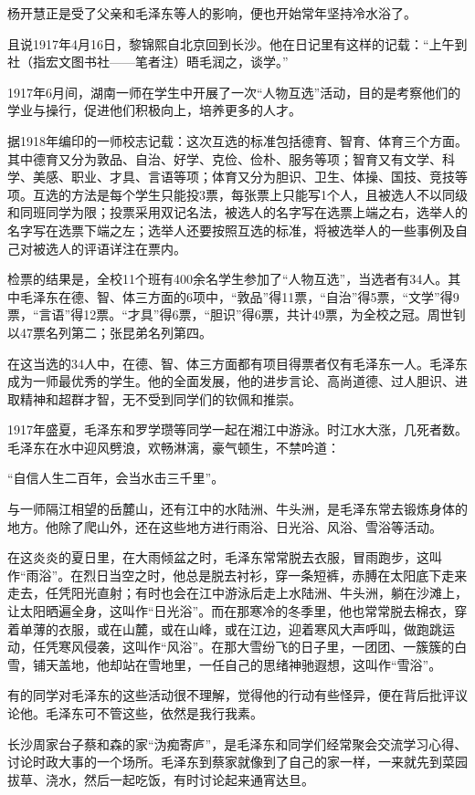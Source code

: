 \documentclass[../../dazhuan.tex]{subfiles}
\begin{document}
杨开慧正是受了父亲和毛泽东等人的影响，便也开始常年坚持冷水浴了。

且说1917年4月16日，黎锦熙自北京回到长沙。他在日记里有这样的记载：“上午到社（指宏文图书社——笔者注）晤毛润之，谈学。”

1917年6月间，湖南一师在学生中开展了一次“人物互选”活动，目的是考察他们的学业与操行，促进他们积极向上，培养更多的人才。

据1918年编印的一师校志记载：这次互选的标准包括德育、智育、体育三个方面。其中德育又分为敦品、自治、好学、克俭、俭朴、服务等项；智育又有文学、科学、美感、职业、才具、言语等项；体育又分为胆识、卫生、体操、国技、竞技等项。互选的方法是每个学生只能投3票，每张票上只能写1个人，且被选人不以同级和同班同学为限；投票采用双记名法，被选人的名字写在选票上端之右，选举人的名字写在选票下端之左；选举人还要按照互选的标准，将被选举人的一些事例及自己对被选人的评语详注在票内。

检票的结果是，全校11个班有400余名学生参加了“人物互选”，当选者有34人。其中毛泽东在德、智、体三方面的6项中，“敦品”得11票，“自治”得5票，“文学”得9票，“言语”得12票。“才具”得6票，“胆识”得6票，共计49票，为全校之冠。周世钊以47票名列第二；张昆弟名列第四。

在这当选的34人中，在德、智、体三方面都有项目得票者仅有毛泽东一人。毛泽东成为一师最优秀的学生。他的全面发展，他的进步言论、高尚道德、过人胆识、进取精神和超群才智，无不受到同学们的钦佩和推崇。     

1917年盛夏，毛泽东和罗学瓒等同学一起在湘江中游泳。时江水大涨，几死者数。毛泽东在水中迎风劈浪，欢畅淋漓，豪气顿生，不禁吟道：

“自信人生二百年，会当水击三千里”。

与一师隔江相望的岳麓山，还有江中的水陆洲、牛头洲，是毛泽东常去锻炼身体的地方。他除了爬山外，还在这些地方进行雨浴、日光浴、风浴、雪浴等活动。

在这炎炎的夏日里，在大雨倾盆之时，毛泽东常常脱去衣服，冒雨跑步，这叫作“雨浴”。在烈日当空之时，他总是脱去衬衫，穿一条短裤，赤膊在太阳底下走来走去，任凭阳光直射；有时也会在江中游泳后走上水陆洲、牛头洲，躺在沙滩上，让太阳晒遍全身，这叫作“日光浴”。而在那寒冷的冬季里，他也常常脱去棉衣，穿着单薄的衣服，或在山麓，或在山峰，或在江边，迎着寒风大声呼叫，做跑跳运动，任凭寒风侵袭，这叫作“风浴”。在那大雪纷飞的日子里，一团团、一簇簇的白雪，铺天盖地，他却站在雪地里，一任自己的思绪神驰遐想，这叫作“雪浴”。

有的同学对毛泽东的这些活动很不理解，觉得他的行动有些怪异，便在背后批评议论他。毛泽东可不管这些，依然是我行我素。

长沙周家台子蔡和森的家“沩痴寄庐”，是毛泽东和同学们经常聚会交流学习心得、讨论时政大事的一个场所。毛泽东到蔡家就像到了自己的家一样，一来就先到菜园拔草、浇水，然后一起吃饭，有时讨论起来通宵达旦。
\end{document}
